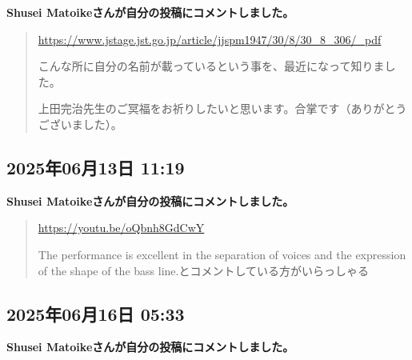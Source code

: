 \textbf{Shusei Matoikeさんが自分の投稿にコメントしました。}

\begin{quote}
\url{https://www.jstage.jst.go.jp/article/jjspm1947/30/8/30_8_306/_pdf}

こんな所に自分の名前が載っているという事を、最近になって知りました。

上田完治先生のご冥福をお祈りしたいと思います。合掌です（ありがとうございました）。
\end{quote}

\subsection*{2025年06月13日 11:19}

\textbf{Shusei Matoikeさんが自分の投稿にコメントしました。}

\begin{quote}
\url{https://youtu.be/oQbnh8GdCwY}

The performance is excellent in the separation of voices and the expression of the shape of the bass line.とコメントしている方がいらっしゃる
\end{quote}

\subsection*{2025年06月16日 05:33}

\textbf{Shusei Matoikeさんが自分の投稿にコメントしました。}

